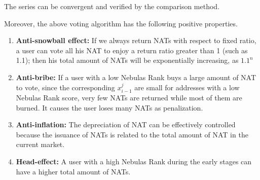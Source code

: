 The series can be convergent and verified by the comparison method.

Moreover, the above voting algorithm has the following positive properties.
\begin{enumerate}
	\item \textbf{Anti-snowball effect:} If we always return NATs  with respect to fixed ratio, a user can vote all his  NAT to enjoy a return ratio greater than 1 (such as 1.1); then his total amount of  NATs will be exponentially increasing, as  $1.1^n$
	\item \textbf{Anti-bribe:} If a user with a low Nebulas Rank buys a large amount of NAT to vote, since the corresponding $x_{i-1}^j$ are small for addresses with a low Nebulas Rank score, very few NATs are returned while most of them are burned. It causes the user loses many NATs as penalization.
	\item \textbf{Anti-inflation:} The depreciation of NAT can be effectively controlled because the issuance of NATs is related to the total amount of NAT in the current market.
	\item \textbf{Head-effect:} A user with a high Nebulas Rank during the early stages can have a higher total amount of NATs.
\end{enumerate}
